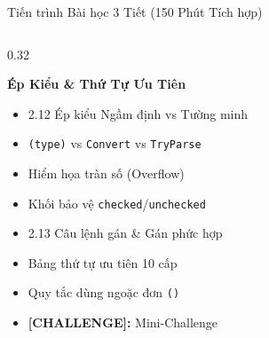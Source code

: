 \documentclass[aspectratio=169, 10pt]{beamer}
\begin{document}
\begin{frame}{Tiến trình Bài học 3 Tiết (150 Phút Tích hợp)}
\begin{columns}[T]
    \begin{column}{0.32\textwidth}
      \begin{tcolorbox}[colback=UniGreen!5,colframe=UniGreen,title=\textbf{TIẾT 3 (50')},fonttitle=\small\bfseries]
        \textbf{Ép Kiểu \& Thứ Tự Ưu Tiên}
        \begin{itemize}\scriptsize
          \item 2.12 Ép kiểu Ngầm định vs Tường minh
          \item \texttt{(type)} vs \texttt{Convert} vs \texttt{TryParse}
          \item Hiểm họa tràn số (Overflow)
          \item Khối bảo vệ \texttt{checked}/\texttt{unchecked}
          \item 2.13 Câu lệnh gán \& Gán phức hợp
          \item Bảng thứ tự ưu tiên 10 cấp
          \item Quy tắc dùng ngoặc đơn \texttt{()}
          \item \textbf{[CHALLENGE]:} Mini-Challenge
        \end{itemize}
      \end{tcolorbox}
    \end{column}
  \end{columns}
\end{frame}
\end{document}
